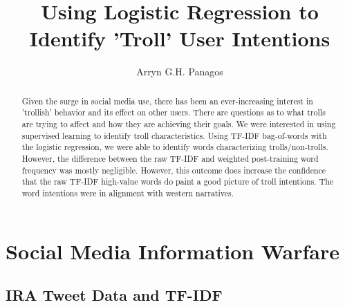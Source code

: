 \documentclass[runningheads]{llncs}
\begin{document}
%
\title{Using Logistic Regression to Identify 'Troll' User Intentions}
%
%
%
%
\author{Arryn G.H. Panagos}


%
\maketitle              %
%
\begin{abstract}
 Given the surge in social media use, there has been an ever-increasing interest in 'trollish' behavior and its effect on other users. There are questions as to what trolls are trying to affect and how they are achieving their goals. We were interested in using supervised learning to identify troll characteristics. Using TF-IDF bag-of-words with the logistic regression, we were able to identify words characterizing trolls/non-trolls. However, the difference between the raw TF-IDF and weighted post-training word frequency was mostly negligible. However, this outcome does increase the confidence that the raw TF-IDF high-value words do paint a good picture of troll intentions. The word intentions were in alignment with western narratives.
\
\end{abstract}
%
%
%
\section{Social Media Information Warfare}
\subsection{IRA Tweet Data and TF-IDF}
\end{document}

